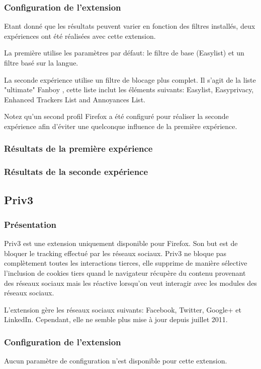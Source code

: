 \subsubsection{Configuration de l'extension}
Etant donné que les résultats peuvent varier en fonction des filtres installés, deux expériences ont été réalisées avec cette extension.

La première utilise les paramètres par défaut: le filtre de base (Easylist) et un filtre basé sur la langue.

La seconde expérience utilise un filtre de blocage plus complet. Il s'agit de la liste "ultimate" Fanboy \cite{fanboy_filters}, cette liste inclut les éléments suivants: Easylist, Easyprivacy, Enhanced Trackers List and Annoyances List.

Notez qu'un second profil Firefox a été configuré pour réaliser la seconde expérience afin d'éviter une quelconque influence de la première expérience.

\subsubsection{Résultats de la première expérience}
\subsubsection{Résultats de la seconde expérience}

\subsection{Priv3}
\subsubsection{Présentation}
Priv3 \cite{priv3} est une extension uniquement disponible pour Firefox. Son but est de bloquer le tracking effectué par les réseaux sociaux. Priv3 ne bloque pas complètement toutes les interactions tierces, elle supprime de manière sélective l'inclusion de cookies tiers quand le navigateur récupère du contenu provenant des réseaux sociaux mais les réactive lorsqu'on veut interagir avec les modules des réseaux sociaux.
\newline

L'extension gère les réseaux sociaux suivants: Facebook, Twitter, Google+ et LinkedIn. Cependant, elle ne semble plus mise à jour depuis juillet 2011.

\subsubsection{Configuration de l'extension}
Aucun paramètre de configuration n'est disponible pour cette extension.

